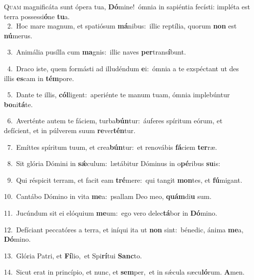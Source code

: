 \lettrine{\initial\textcolor{\initialcolor}{Q}}{uam} magnificáta sunt ópera tua, \textbf{Dó}\-mine!~\star ómnia in sapiéntia fecísti: impléta est terra possessi\-\textbf{ó}\-ne \textbf{tu}\-a.\\
{\numbfont\textcolor{\numbcolor}{~2.}}~Hoc mare magnum, et spatiósum \textbf{má}\-nibus:~\star illic reptília, quorum \textbf{non} est \textbf{nú}\-merus.\par
{\numbfont\textcolor{\numbcolor}{~3.}}~Animália pusílla cum \textbf{ma}\-gnis:~\star illic naves \textbf{per}\-trans\-\textbf{í}\-bunt.\par
{\numbfont\textcolor{\numbcolor}{~4.}}~Draco iste, quem formásti ad illudéndum \textbf{e}\-i:~\star ómnia a te exspéctant ut des illis \textbf{es}\-cam in \textbf{tém}\-pore.\par
{\numbfont\textcolor{\numbcolor}{~5.}}~Dante te illis, \textbf{cól}\-ligent:~\star aperiénte te manum tuam, ómnia implebúntur \textbf{bo}\-ni\-\textbf{tá}\-te.\par
{\numbfont\textcolor{\numbcolor}{~6.}}~Averténte autem te fáciem, turba\-\textbf{bún}\-tur:~\star áuferes spíritum eórum, et defícient, et in púlverem suum \textbf{re}\-ver\-\textbf{tén}\-tur.\par
{\numbfont\textcolor{\numbcolor}{~7.}}~Emíttes spíritum tuum, et crea\-\textbf{bún}\-tur:~\star et renovábis \textbf{fá}\-ciem \textbf{ter}\-ræ.\par
{\numbfont\textcolor{\numbcolor}{~8.}}~Sit glória Dómini in \textbf{sǽ}\-culum:~\star lætábitur Dóminus in o\-\textbf{pé}\-ribus \textbf{su}\-is:\par
{\numbfont\textcolor{\numbcolor}{~9.}}~Qui réspicit terram, et facit eam \textbf{tré}\-mere:~\star qui tangit \textbf{mon}\-tes, et \textbf{fú}\-migant.\par
{\numbfont\textcolor{\numbcolor}{10.}}~Cantábo Dómino in vita \textbf{me}\-a:~\star psallam Deo meo, \textbf{quám}\-di\textbf{u} sum.\par
{\numbfont\textcolor{\numbcolor}{11.}}~Jucúndum sit ei elóquium \textbf{me}\-um:~\star ego vero delec\-\textbf{tá}\-bor in \textbf{Dó}\-mino.\par
{\numbfont\textcolor{\numbcolor}{12.}}~Defíciant peccatóres a terra, et iníqui ita ut \textbf{non} sint:~\star bénedic, ánima \textbf{me}\-a, \textbf{Dó}\-mino.\par
{\numbfont\textcolor{\numbcolor}{13.}}~Glória Patri, et \textbf{Fí}\-lio,~\star et Spi\-\textbf{rí}\-tui \textbf{Sanc}\-to.\par
{\numbfont\textcolor{\numbcolor}{14.}}~Sicut erat in princípio, et nunc, et \textbf{sem}\-per,~\star et in sǽcula sæcu\-\textbf{ló}\-rum. \textbf{A}\-men.\par
